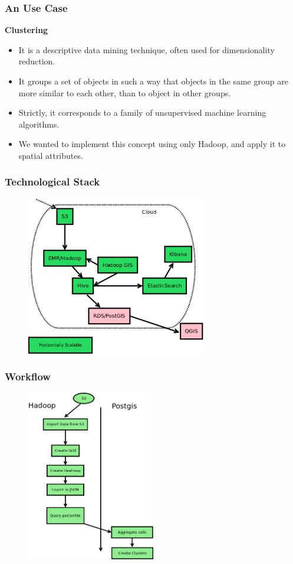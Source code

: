 \documentclass[hyperref={pdfpagelabels=true}]{beamer}
\begin{document}
\begin{frame}
\frametitle{An Use Case}
\textbf{Clustering}
    \begin{itemize}    
      \item<2->It is a descriptive data mining technique, often used for dimensionality reduction.
      \item<3->It groups a set of objects in such a way that objects in the same group are more similar to each other, than to object in other groups.
      \item<4->Strictly, it corresponds to a family of unsupervised machine learning algorithms.
      \item<5->We wanted to implement this concept using only Hadoop, and apply it to spatial attributes.%
     \end{itemize}
\end{frame}

\begin{frame}
\frametitle{Technological Stack}
      \begin{figure}   
      \includegraphics[width=0.7\textwidth]{stack.png}   
     \end{figure}       
\end{frame}

\begin{frame}
\frametitle{Workflow}
      \begin{figure}   
      \includegraphics[width=0.5\textwidth]{geo3.png}   
     \end{figure}       
\end{frame}
\end{document}
